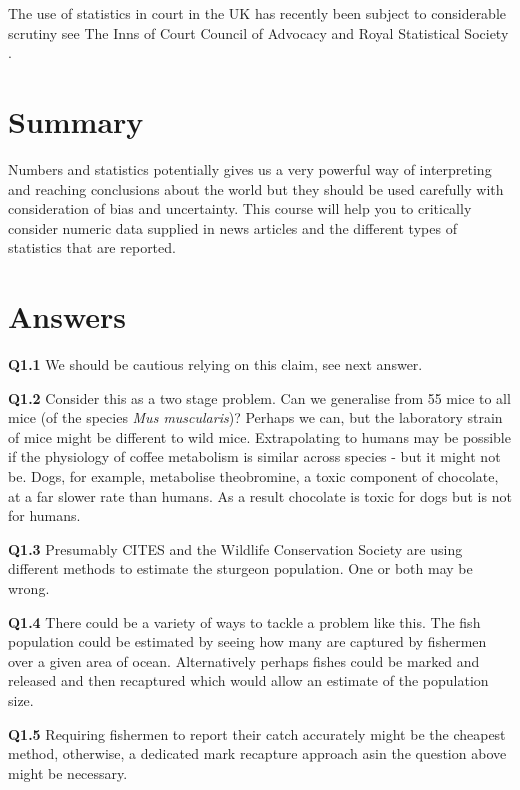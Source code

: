 \documentclass[
  oneside]{krantz}
\begin{document}
The use of statistics in court in the UK has recently been subject to considerable scrutiny see The Inns of Court Council of Advocacy and Royal Statistical Society \citeyearpar{innsof2017court}.

\hypertarget{SUMintro}{%
\section{Summary}\label{SUMintro}}

Numbers and statistics potentially gives us a very powerful way of interpreting and reaching conclusions about the world but they should be used carefully with consideration of bias and uncertainty. This course will help you to critically consider numeric data supplied in news articles and the different types of statistics that are reported.

\hypertarget{ANSintro}{%
\section{Answers}\label{ANSintro}}

\textbf{Q1.1} We should be cautious relying on this claim, see next answer.

\textbf{Q1.2} Consider this as a two stage problem. Can we generalise from 55 mice to all mice (of the species \emph{Mus muscularis})? Perhaps we can, but the laboratory strain of mice might be different to wild mice. Extrapolating to humans may be possible if the physiology of coffee metabolism is similar across species - but it might not be. Dogs, for example, metabolise theobromine, a toxic component of chocolate, at a far slower rate than humans. As a result chocolate is toxic for dogs but is not for humans.

\textbf{Q1.3} Presumably CITES and the Wildlife Conservation Society are using different methods to estimate the sturgeon population. One or both may be wrong.

\textbf{Q1.4} There could be a variety of ways to tackle a problem like this. The fish population could be estimated by seeing how many are captured by fishermen over a given area of ocean. Alternatively perhaps fishes could be marked and released and then recaptured which would allow an estimate of the population size.

\textbf{Q1.5} Requiring fishermen to report their catch accurately might be the cheapest method, otherwise, a dedicated mark recapture approach asin the question above might be necessary.
\end{document}
